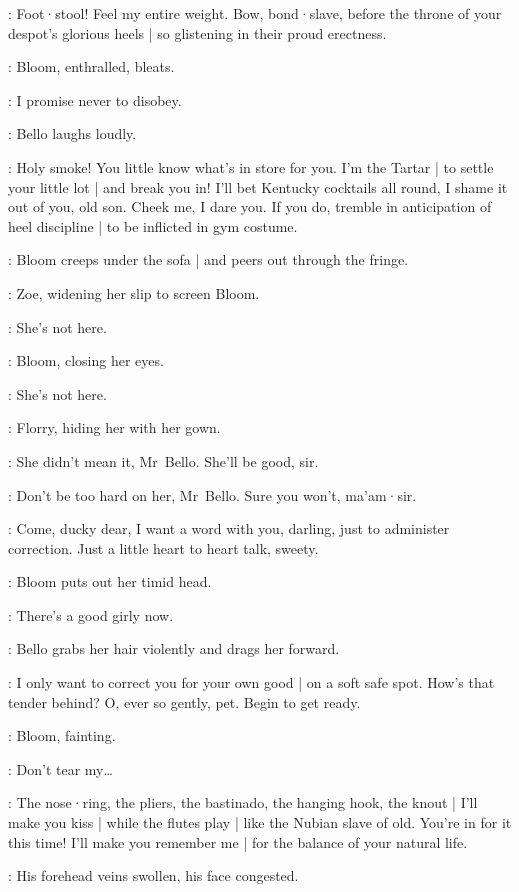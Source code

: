 \Bello:
Foot·stool!
Feel my entire weight.
Bow,
bond·slave,
before the throne of your despot's glorious heels |
so glistening in their proud erectness.

:
Bloom,
enthralled,
bleats.

\Bloom:
I promise never to disobey.

:
Bello laughs loudly.

\Bello:
Holy smoke!
You little know what's in store for you.
I'm the Tartar |
to settle your little lot  |
and break you in!
I'll bet Kentucky cocktails all round,
I shame it out of you,
old son.
Cheek me,
I dare you.
If you do,
tremble in anticipation of heel discipline |
to be inflicted in gym costume.%

:
Bloom creeps under the sofa |
and peers out through the fringe.

:
Zoe,
widening her slip to screen Bloom.

\Zoe:
She's not here.

:
Bloom,
closing her eyes.

\Bloom:
She's not here.

:
Florry,
hiding her with her gown.

\Florry:
She didn't mean it,
Mr~Bello.
She'll be good,
sir.

\Kitty:
Don't be too hard on her,
Mr~Bello.
%
Sure you won't,
ma'am·sir.

\Bello:
Come,
ducky dear,
I want a word with you,
darling,
just to administer correction.
Just a little heart to heart talk,
sweety.

:
Bloom puts out her timid head.

\Bello:
There's a good girly now.

:
Bello grabs her hair violently and drags her forward.

\Bello:
I only want to correct you for your own good |
on a soft safe spot.
How's that tender behind?
O,
ever so gently,
pet.
Begin to get ready.

:
Bloom,
fainting.

\Bloom:
Don't tear my…

\Bello:
The nose·ring,
the pliers,
the bastinado,
the hanging hook,
the knout |
I'll make you kiss |
while the flutes play |
like the Nubian slave of old.
You're in for it this time!
I'll make you remember me |
for the balance of your natural life.

:
His forehead veins swollen,
his face congested.

